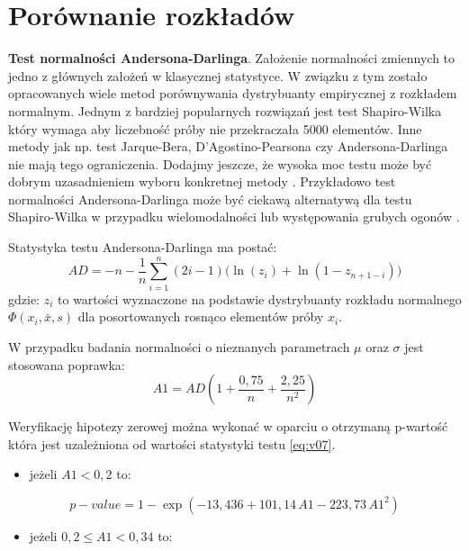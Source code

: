 \documentclass[polish,]{book}
\providecommand{\tightlist}{%
  \setlength{\itemsep}{0pt}\setlength{\parskip}{0pt}}
\begin{document}
\hypertarget{R84}{%
\section{Porównanie rozkładów}\label{R84}}

\textbf{Test normalności Andersona-Darlinga}. Założenie normalności zmiennych to jedno z głównych założeń w klasycznej statystyce. W związku z tym zostało opracowanych wiele metod porównywania dystrybuanty empirycznej z rozkładem normalnym. Jednym z bardziej popularnych rozwiązań jest test Shapiro-Wilka który wymaga aby liczebność próby nie przekraczała 5000 elementów. Inne metody jak np. test Jarque-Bera, D'Agostino-Pearsona czy Andersona-Darlinga nie mają tego ograniczenia. Dodajmy jeszcze, że wysoka moc testu może być dobrym uzasadnieniem wyboru konkretnej metody \citep{biecek2013}. Przykładowo test normalności Andersona-Darlinga może być ciekawą alternatywą dla testu Shapiro-Wilka w przypadku wielomodalności lub występowania grubych ogonów \citep[str. 244-246]{biecek2017}.

Statystyka testu Andersona-Darlinga ma postać:
\begin{equation}
AD = -n-\frac{1}{n}\sum_{i=1}^n(2i-1)\big(\ln(z_i)+\ln(1-z_{n+1-i})\big)
\label{eq:v06}
\end{equation}
gdzie: \(z_i\) to wartości wyznaczone na podstawie dystrybuanty rozkładu normalnego \(\Phi(x_i,\bar{x},s)\) dla posortowanych rosnąco elementów próby \(x_i\).

W przypadku badania normalności o nieznanych parametrach \(\mu\) oraz \(\sigma\) jest stosowana poprawka:
\begin{equation}
A1=AD\left(1+\frac{0,75}{n}+\frac{2,25}{n^2}\right)
\label{eq:v07}
\end{equation}

Weryfikację hipotezy zerowej można wykonać w oparciu o otrzymaną p-wartość która jest uzależniona od wartości statystyki testu \eqref{eq:v07}.

\begin{itemize}
\tightlist
\item
  jeżeli \(A1 < 0,2\) to:
\end{itemize}

\begin{equation}
p-value=1-\exp(-13,436+101,14\,A1-223,73\,A1^2)
\label{eq:v08a}
\end{equation}

\begin{itemize}
\tightlist
\item
  jeżeli \(0,2\leq A1<0,34\) to:
\end{itemize}
\end{document}
